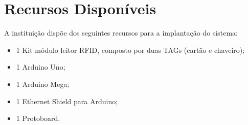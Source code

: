\section{Recursos Disponíveis}

A instituição dispõe dos seguintes recursos para a implantação do sistema:
\begin{itemize}
\item 1 Kit módulo leitor RFID, composto por duas TAGs (cartão e chaveiro);
\item 1 Arduino Uno;
\item 1 Arduino Mega;
\item 1 Ethernet Shield para Arduino;
\item 1 Protoboard.
\end{itemize}